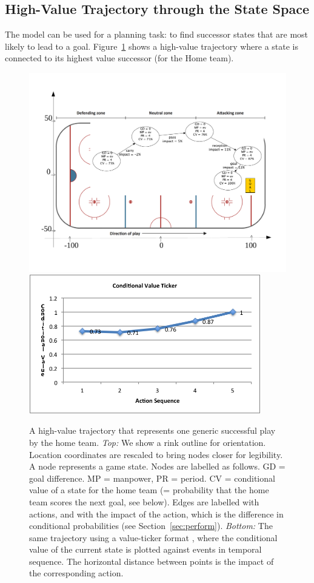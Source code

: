 \subsection{High-Value Trajectory through the State Space} 

The model can be used for a planning task: to  find successor states that are most likely to lead to a goal. Figure~\ref{fig:trajectory} shows a high-value trajectory where a state is connected to its highest value successor (for the Home team). 

\begin{figure}
\centering 
\includegraphics[width=1\textwidth]{trajectory-rink}
\includegraphics[width=0.9\textwidth]{value-ticker.png}
\caption{A high-value trajectory that represents one generic successful play by the home team. {\em Top:} We show a rink outline for orientation. Location coordinates are rescaled to bring nodes closer for legibility. A node represents a game state. Nodes are labelled as follows. GD = goal difference. MP = manpower, PR = period. CV = conditional value of a state for the home team (= probability that the home team scores the next goal, see below). Edges are labelled with actions, and with the impact of the action, which is the difference in conditional probabilities (see Section~\ref{sec:perform}). {\em Bottom:} The same trajectory using a value-ticker format \citep{Cervone2014a}, where the conditional value of the current state is  plotted against events in temporal sequence. The horizontal distance between points is the impact of the corresponding action. }
\label{fig:trajectory}
\end{figure}
